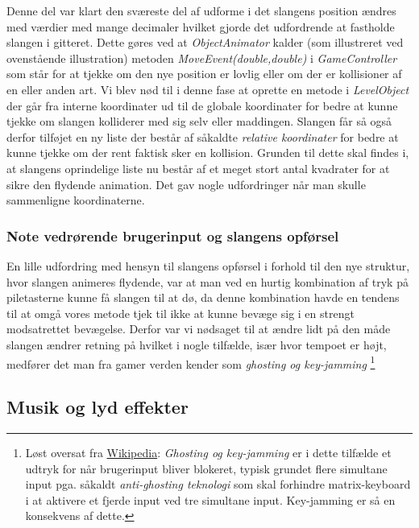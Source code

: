 \documentclass[]{article}
\begin{document}
	Denne del var klart den sværeste del af udforme i det slangens position ændres med værdier med mange decimaler hvilket gjorde det udfordrende at fastholde slangen i gitteret. Dette gøres ved at \textit{ObjectAnimator} kalder (som illustreret ved ovenstående illustration) metoden \textit{MoveEvent(double,double)} i \textit{GameController} som står for at tjekke om den nye position er lovlig eller om der er kollisioner af en eller anden art. Vi blev nød til i denne fase at oprette en metode i \textit{LevelObject} der går fra interne koordinater ud til de globale koordinater for bedre at kunne tjekke om slangen kolliderer med sig selv eller maddingen. Slangen får så også derfor tilføjet en ny liste der består af såkaldte \textit{relative koordinater} for bedre at kunne tjekke om der rent faktisk sker en kollision. Grunden til dette skal findes i, at slangens oprindelige liste nu består af et meget stort antal kvadrater for at sikre den flydende animation. Det gav nogle udfordringer når man skulle sammenligne koordinaterne.\\
	
	\subsubsection{Note vedrørende brugerinput og slangens opførsel}
	
	En lille udfordring med hensyn til slangens opførsel i forhold til den nye struktur, hvor slangen animeres flydende, var at man ved en hurtig kombination af tryk på piletasterne kunne få slangen til at dø, da denne kombination havde en tendens til at omgå vores metode tjek til ikke at kunne bevæge sig i en strengt modsatrettet bevægelse. Derfor var vi nødsaget til at ændre lidt på den måde slangen ændrer retning på hvilket i nogle tilfælde, især hvor tempoet er højt, medfører det man fra gamer verden kender som \textit{ghosting og key-jamming} \footnote{Løst oversat fra \href{https://en.wikipedia.org/wiki/Rollover_(key)}{Wikipedia}: \textit{Ghosting og key-jamming} er i dette tilfælde et udtryk for når brugerinput bliver blokeret, typisk grundet flere simultane input pga. såkaldt \textit{anti-ghosting teknologi} som skal forhindre matrix-keyboard i at aktivere et fjerde input ved tre simultane input. Key-jamming er så en konsekvens af dette.}
	
	\subsection{Musik og lyd effekter}
	
\end{document}
